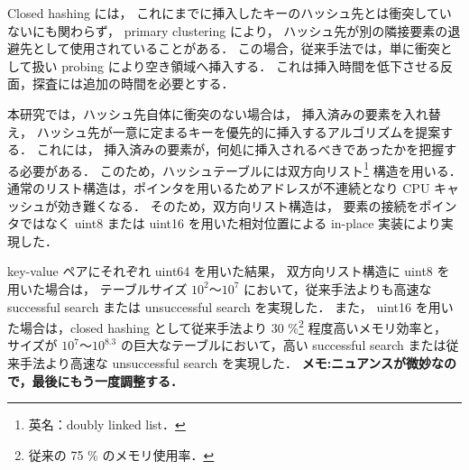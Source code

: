 Closed hashing には，
これにまでに挿入したキーのハッシュ先とは衝突していないにも関わらず，
primary clustering により，
ハッシュ先が別の隣接要素の退避先として使用されていることがある．
この場合，従来手法では，単に衝突として扱い probing により空き領域へ挿入する．
これは挿入時間を低下させる反面，探査には追加の時間を必要とする．

本研究では，ハッシュ先自体に衝突のない場合は，
挿入済みの要素を入れ替え，
ハッシュ先が一意に定まるキーを優先的に挿入するアルゴリズムを提案する．
これには，
挿入済みの要素が，何処に挿入されるべきであったかを把握する必要がある．
このため，ハッシュテーブルには双方向リスト\footnote{英名：doubly linked list．} 構造を用いる．
通常のリスト構造は，ポインタを用いるためアドレスが不連続となり CPU キャッシュが効き難くなる．
そのため，双方向リスト構造は，
要素の接続をポインタではなく uint8 または uint16 を用いた相対位置による in-place 実装により実現した．

key-value ペアにそれぞれ uint64 を用いた結果，
双方向リスト構造に uint8 を用いた場合は，
テーブルサイズ $10^2〜10^{7}$ において，従来手法よりも高速な successful search または unsuccessful search を実現した．
また，
uint16 を用いた場合は，closed hashing として従来手法より 30 \%\footnote{従来の 75 \% のメモリ使用率．} 程度高いメモリ効率と，
サイズが $10^7〜10^{8.3}$ の巨大なテーブルにおいて，高い successful search または従来手法より高速な unsuccessful search を実現した．
{\bf \color{red}メモ:ニュアンスが微妙なので，最後にもう一度調整する．}






